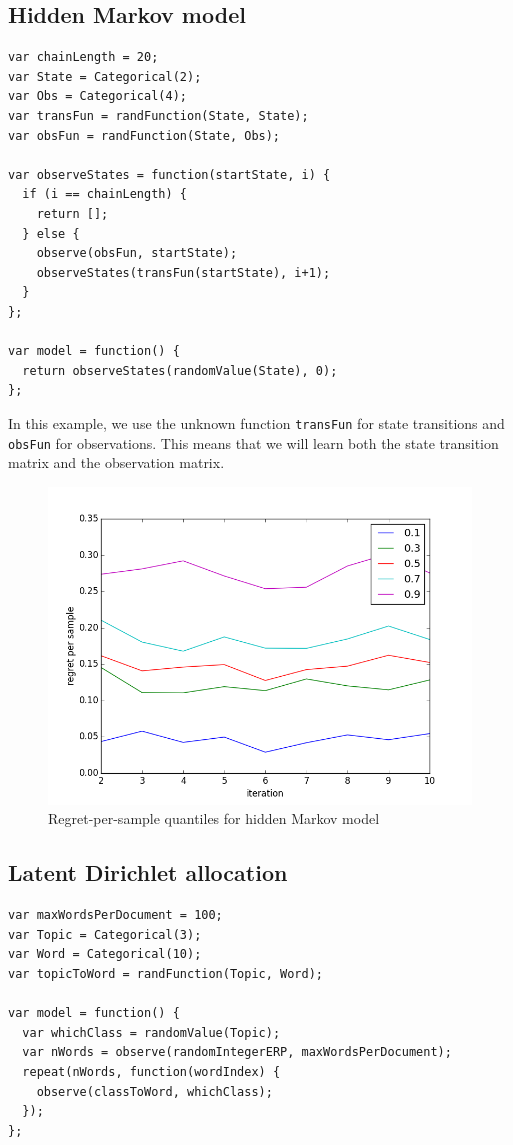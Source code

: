\documentclass{article}
\begin{document}
  \subsection{Hidden Markov model}
{\small
\begin{lstlisting}
var chainLength = 20;
var State = Categorical(2);
var Obs = Categorical(4);
var transFun = randFunction(State, State);
var obsFun = randFunction(State, Obs);

var observeStates = function(startState, i) {
  if (i == chainLength) {
    return [];
  } else {
    observe(obsFun, startState);
    observeStates(transFun(startState), i+1);
  }
};

var model = function() {
  return observeStates(randomValue(State), 0);
};
\end{lstlisting}
}

In this example, we use the unknown function \texttt{transFun} for state transitions and \texttt{obsFun} for observations.  This means that we will learn both the state transition matrix and the observation matrix.

  \begin{figure}[h]
\begin{center}
  \includegraphics[scale=0.5]{../plots/accuracy_hmm.png}
\end{center}
\caption{Regret-per-sample quantiles for hidden Markov model}
\end{figure}

\subsection{Latent Dirichlet allocation}
{\small
\begin{lstlisting}
var maxWordsPerDocument = 100;
var Topic = Categorical(3);
var Word = Categorical(10);
var topicToWord = randFunction(Topic, Word);

var model = function() {
  var whichClass = randomValue(Topic);
  var nWords = observe(randomIntegerERP, maxWordsPerDocument);
  repeat(nWords, function(wordIndex) {
    observe(classToWord, whichClass);
  });
};
\end{lstlisting}
}
\end{document}
